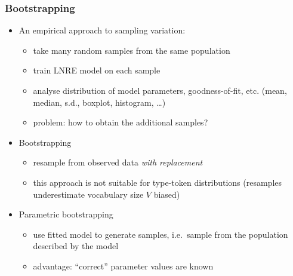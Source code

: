\documentclass[t]{beamer} %
\begin{document}
\begin{frame}
  \frametitle{Bootstrapping}

  \begin{itemize}
  \item<1-> An empirical approach to sampling variation:
    \begin{itemize}
    \item take many random samples from the same population
    \item train LNRE model on each sample
    \item analyse distribution of model parameters, goodness-of-fit, etc.
      (mean, median, s.d., boxplot, histogram, \ldots)
    \item problem: how to obtain the additional samples?
    \end{itemize}
  \item<2-> Bootstrapping \citep{Efron:79}
    \begin{itemize}
    \item resample from observed data \emph{with replacement}
    \item this approach is not suitable for type-token distributions
      (resamples underestimate vocabulary size $V$ \so biased)
    \end{itemize}
  \item<3-> Parametric bootstrapping
    \begin{itemize}
    \item use fitted model to generate samples, i.e.\ sample from the population described by the model
    \item advantage: ``correct'' parameter values are known
    \end{itemize}
  \end{itemize}
\end{frame}
\end{document}
